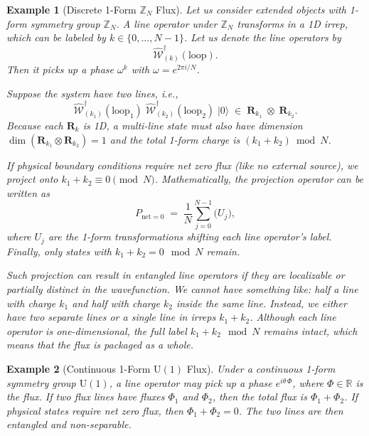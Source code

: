\documentclass[12pt,a4paper]{article}
\newtheorem{example}{Example}
\begin{document}
\begin{example}[Discrete 1-Form $\mathbb{Z}_N$ Flux]
	Let us consider extended objects with 1-form symmetry group $\mathbb{Z}_N$.
	A line operator under $\mathbb{Z}_N$ transforms in a 1D irrep, which can be labeled by $k \in \{0,\dots,N-1\}$.
	Let us denote the line operators by	
	\[
	\hat{\mathcal{W}}^\dagger_{(k)}(\mathrm{loop}).
	\]	
	Then it picks up a phase $\omega^k$ with $\omega = e^{2\pi i /N}$.
	
	Suppose the system have two lines, i.e.,	
	\[
	\hat{\mathcal{W}}^\dagger_{(k_1)}(\mathrm{loop}_1)
	\;\hat{\mathcal{W}}^\dagger_{(k_2)}(\mathrm{loop}_2)
	\;\lvert 0\rangle
	\;\in\;
	\mathbf{R}_{k_1} \;\otimes\;\mathbf{R}_{k_2}.
	\]
	Because each $\mathbf{R}_k$ is 1D, a multi-line state must also have dimension $\dim(\mathbf{R}_{k_1}\otimes\mathbf{R}_{k_2})=1$ and the total 1-form charge is $(k_1 + k_2)\bmod N$.
	
	If physical boundary conditions require net zero flux (like no external source), we project onto $k_1 + k_2 \equiv 0 \pmod N$.
	Mathematically, the projection operator can be written as
	\[
	P_{\mathrm{net}=0}
	\;=\;\frac{1}{N} \sum_{j=0}^{N-1} \bigl(U_j\bigr),
	\]
	where $U_j$ are the 1-form transformations shifting each line operator's label.
	Finally, only states with $k_1 + k_2=0\mod N$ remain.
	
	Such projection can result in entangled line operators if they are localizable or partially distinct in the wavefunction.
	We cannot have something like: half a line with charge $k_1$ and half with charge $k_2$ inside the same line.
	Instead, we either have two separate lines or a single line in irreps $k_1 + k_2$.	
	Although each line operator is one-dimensional, the full label $k_1 + k_2 \mod N$ remains intact, which means that the flux is packaged as a whole.
\end{example}


\begin{example}[Continuous 1-Form $\mathrm{U}(1)$ Flux]
	Under a continuous 1-form symmetry group $\mathrm{U}(1)$, a line operator may pick up a phase $e^{i \theta \,\Phi}$, where $\Phi \in \mathbb{R}$ is the flux.
	If two flux lines have fluxes $\Phi_1$ and $\Phi_2$, then the total flux is $\Phi_1 + \Phi_2$.
	If physical states require net zero flux, then $\Phi_1 + \Phi_2 = 0$.
	The two lines are then entangled and non-separable.
\end{example}
\end{document}
